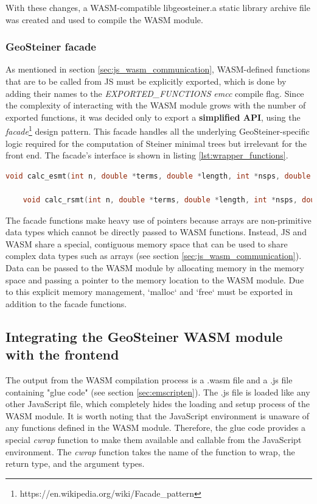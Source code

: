 \documentclass{l4proj}
\begin{document}
With these changes, a WASM-compatible libgeosteiner.a static library archive file was created and used to compile the WASM module.

\subsubsection{GeoSteiner facade}
As mentioned in section \ref{sec:js_wasm_communication}, WASM-defined functions that are to be called from JS must be explicitly exported, which is done by adding their names to the \textit{EXPORTED\_FUNCTIONS} \textit{emcc} compile flag.
Since the complexity of interacting with the WASM module grows with the number of exported functions, it was decided only to export a \textbf{simplified API}, using the \textit{facade}\footnote{https://en.wikipedia.org/wiki/Facade\_pattern} design pattern. This facade handles all the underlying GeoSteiner-specific logic required for the computation of Steiner minimal trees but irrelevant for the front end. The facade's interface is shown in listing \ref{lst:wrapper_functions}.

\begin{lstlisting}[language=C,caption=Wrapper functions for the Geosteiner library,label=lst:wrapper_functions]
    void calc_esmt(int n, double *terms, double *length, int *nsps, double *sps, int *nedges, int *edges);

    void calc_rsmt(int n, double *terms, double *length, int *nsps, double *sps, int *nedges, int *edges);
\end{lstlisting}

The facade functions make heavy use of pointers because arrays are non-primitive data types which cannot be directly passed to WASM functions. Instead, JS and WASM share a special, contiguous memory space that can be used to share complex data types such as arrays (see section \ref{sec:js_wasm_communication}). Data can be passed to the WASM module by allocating memory in the memory space and passing a pointer to the memory location to the WASM module. Due to this explicit memory management, `malloc` and `free` must be exported in addition to the facade functions.

\subsection{Integrating the GeoSteiner WASM module with the frontend}
The output from the WASM compilation process is a .wasm file and a .js file containing "glue code" (see section \ref{sec:emscripten}). The .js file is loaded like any other JavaScript file, which completely hides the loading and setup process of the WASM module.
It is worth noting that the JavaScript environment is unaware of any functions defined in the WASM module. Therefore, the glue code provides a special \textit{cwrap} function to make them available and callable from the JavaScript environment. The \textit{cwrap} function takes the name of the function to wrap, the return type, and the argument types.
\end{document}
